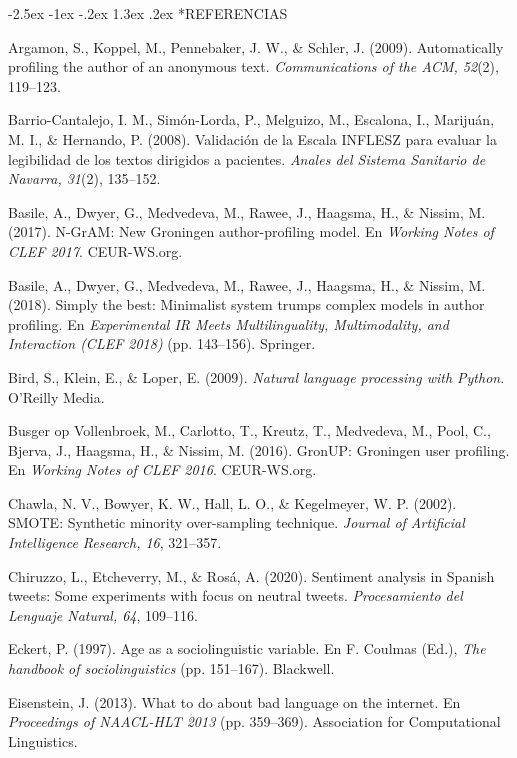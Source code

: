\documentclass[10pt,twocolumn]{article}
\makeatletter
\renewcommand{\section}{\@startsection{section}{1}{\z@}%
  {-2.5ex \@plus -1ex \@minus -.2ex}%
  {1.3ex \@plus .2ex}%
  {\normalfont\large\bfseries\centering}}
\makeatother
\begin{document}
\section*{REFERENCIAS}
\begin{list}{}{\setlength{\leftmargin}{1.5em}\setlength{\itemindent}{-1.5em}\setlength{\itemsep}{2pt}\setlength{\parsep}{0pt}}\small
\item Argamon, S., Koppel, M., Pennebaker, J. W., \& Schler, J. (2009). Automatically profiling the author of an anonymous text. \textit{Communications of the ACM, 52}(2), 119–123.
\item Barrio-Cantalejo, I. M., Simón-Lorda, P., Melguizo, M., Escalona, I., Marijuán, M. I., \& Hernando, P. (2008). Validación de la Escala INFLESZ para evaluar la legibilidad de los textos dirigidos a pacientes. \textit{Anales del Sistema Sanitario de Navarra, 31}(2), 135–152.
\item Basile, A., Dwyer, G., Medvedeva, M., Rawee, J., Haagsma, H., \& Nissim, M. (2017). N-GrAM: New Groningen author-profiling model. En \textit{Working Notes of CLEF 2017}. CEUR-WS.org.
\item Basile, A., Dwyer, G., Medvedeva, M., Rawee, J., Haagsma, H., \& Nissim, M. (2018). Simply the best: Minimalist system trumps complex models in author profiling. En \textit{Experimental IR Meets Multilinguality, Multimodality, and Interaction (CLEF 2018)} (pp. 143–156). Springer.
\item Bird, S., Klein, E., \& Loper, E. (2009). \textit{Natural language processing with Python}. O’Reilly Media. \textdagger{}
\item Busger op Vollenbroek, M., Carlotto, T., Kreutz, T., Medvedeva, M., Pool, C., Bjerva, J., Haagsma, H., \& Nissim, M. (2016). GronUP: Groningen user profiling. En \textit{Working Notes of CLEF 2016}. CEUR-WS.org.
\item Chawla, N. V., Bowyer, K. W., Hall, L. O., \& Kegelmeyer, W. P. (2002). SMOTE: Synthetic minority over-sampling technique. \textit{Journal of Artificial Intelligence Research, 16}, 321–357.
\item Chiruzzo, L., Etcheverry, M., \& Rosá, A. (2020). Sentiment analysis in Spanish tweets: Some experiments with focus on neutral tweets. \textit{Procesamiento del Lenguaje Natural, 64}, 109–116. \textdagger{}
\item Eckert, P. (1997). Age as a sociolinguistic variable. En F. Coulmas (Ed.), \textit{The handbook of sociolinguistics} (pp. 151–167). Blackwell.
\item Eisenstein, J. (2013). What to do about bad language on the internet. En \textit{Proceedings of NAACL-HLT 2013} (pp. 359–369). Association for Computational Linguistics.

\end{list}
\end{document}
